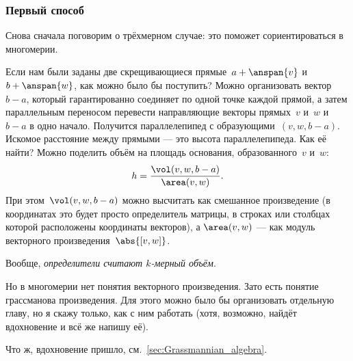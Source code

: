 \begin{solution}
	\subsubsection{Первый способ}

	Снова сначала поговорим о трёхмерном случае: это поможет сориентироваться в многомерии.

	Если нам были заданы две скрещивающиеся прямые~$a + \anspan{v}$ и~$b + \anspan{w}$, как можно было бы поступить? Можно организовать вектор~$b - a$, который гарантированно соединяет по одной точке каждой прямой, а затем параллельным переносом перевести направляющие векторы прямых~$v$ и~$w$ и $b - a$ в одно начало. Получится параллелепипед с образующими~$(v, w, b - a)$. Искомое расстояние между прямыми --- это высота параллелепипеда. Как её найти? Можно поделить объём на площадь основания, образованного~$v$ и~$w$:
	\[
		h =
		\frac{
			\vol(v, w, b-a)
		}{
			\area (v, w)
		}
		.
	\]
	При этом~$\vol(v, w, b-a)$ можно высчитать как смешанное произведение (в координатах это будет просто определитель матрицы, в строках или столбцах которой расположены координаты векторов), а $\area(v, w)$ --- как модуль векторного произведения~$\abs{[v, w]}$.

	Вообще, \emph{определители считают $k$-мерный объём}.

	Но в многомерии нет понятия векторного произведения. Зато есть понятие грассманова произведения. Для этого можно было бы организовать отдельную главу, но я скажу только, как с ним работать (хотя, возможно, найдёт вдохновение и всё же напишу её).

	Что ж, вдохновение пришло, см.~\cref{sec:Grassmannian_algebra}.

		

\end{solution}
